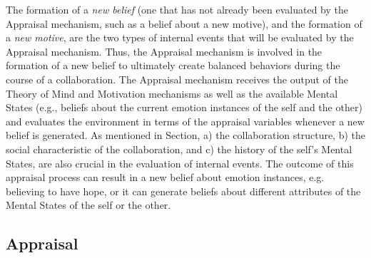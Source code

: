 \documentclass[letterpaper]{article}
\begin{document}
The formation of a \textit{new belief} (one that has not already been evaluated
by the Appraisal mechanism, such as a belief about a new motive), and the
formation of a \textit{new motive}, are the two types of internal events that
will be evaluated by the Appraisal mechanism. Thus, the Appraisal mechanism is
involved in the formation of a new belief to ultimately create balanced
behaviors during the course of a collaboration. The Appraisal mechanism receives
the output of the Theory of Mind and Motivation mechanisms as well as the
available Mental States (e.g., beliefs about the current emotion instances of
the self and the other) and evaluates the environment in terms of the appraisal
variables whenever a new belief is generated. As mentioned in Section, a) the
collaboration structure, b) the social characteristic of the collaboration, and
c) the history of the self's Mental States, are also crucial in the evaluation
of internal events. The outcome of this appraisal process can result in a new
belief about emotion instances, e.g. believing to have hope, or it can generate
beliefs about different attributes of the Mental States of the self or the
other.

\subsection{Appraisal}
\end{document}
